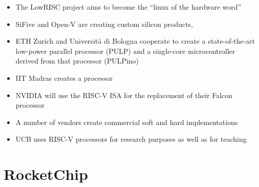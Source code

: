 \documentclass[journal,a4paper]{IEEEtran}
\begin{document}

\begin{itemize}
	\item The LowRISC project aims to become the ``linux of the hardware word''\cite{lowrisc}
	\item SiFive and Open-V are creating custom silicon products\cite{sifive},~\cite{open-v}
	\item ETH Zurich and Università di Bologna cooperate to create a state-of-the-art low-power parallel processor (PULP) and a single-core microcontroller derived from that processor (PULPino)\cite{pulp}
	\item IIT Madras creates a processor\cite{iid-madras}
	\item NVIDIA will use the RISC-V ISA for the replacement of their Falcon processor\cite{nvidia}
	\item A number of vendors create commercial soft and hard implementations\cite{riscv-commercial} %
	\item UCB uses RISC-V processors for research purposes as well as for teaching\cite{ucb}
\end{itemize}

\section{RocketChip}
\end{document}
